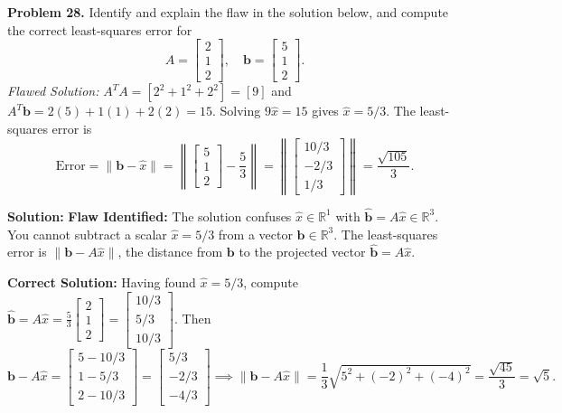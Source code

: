 \documentclass[11pt, letterpaper]{article}
\theoremstyle{definition}
\theoremstyle{remark}
\begin{document}
\textbf{Problem 28.} Identify and explain the flaw in the solution below, and compute the correct least-squares error for
\[
A = \begin{bmatrix} 2 \\ 1 \\ 2 \end{bmatrix}, \quad \mathbf{b} = \begin{bmatrix} 5 \\ 1 \\ 2 \end{bmatrix}.
\]
\textit{Flawed Solution:} $A^T A = [2^2 + 1^2 + 2^2] = [9]$ and $A^T \mathbf{b} = 2(5) + 1(1) + 2(2) = 15$. Solving $9\hat{x} = 15$ gives $\hat{x} = 5/3$. The least-squares error is
\[
\text{Error} = \|\mathbf{b} - \hat{x}\| = \left\| \begin{bmatrix} 5 \\ 1 \\ 2 \end{bmatrix} - \frac{5}{3} \right\| = \left\| \begin{bmatrix} 10/3 \\ -2/3 \\ 1/3 \end{bmatrix} \right\| = \frac{\sqrt{105}}{3}.
\]

\textbf{Solution:}
\textbf{Flaw Identified:} The solution confuses $\hat{x} \in \mathbb{R}^1$ with $\hat{\mathbf{b}} = A\hat{x} \in \mathbb{R}^3$. You cannot subtract a scalar $\hat{x} = 5/3$ from a vector $\mathbf{b} \in \mathbb{R}^3$. The least-squares error is $\|\mathbf{b} - A\hat{x}\|$, the distance from $\mathbf{b}$ to the projected vector $\hat{\mathbf{b}} = A\hat{x}$.

\textbf{Correct Solution:} Having found $\hat{x} = 5/3$, compute $\hat{\mathbf{b}} = A\hat{x} = \frac{5}{3}\begin{bmatrix} 2 \\ 1 \\ 2 \end{bmatrix} = \begin{bmatrix} 10/3 \\ 5/3 \\ 10/3 \end{bmatrix}$. Then
\[
\mathbf{b} - A\hat{x} = \begin{bmatrix} 5 - 10/3 \\ 1 - 5/3 \\ 2 - 10/3 \end{bmatrix} = \begin{bmatrix} 5/3 \\ -2/3 \\ -4/3 \end{bmatrix} \implies \|\mathbf{b} - A\hat{x}\| = \frac{1}{3}\sqrt{5^2 + (-2)^2 + (-4)^2} = \frac{\sqrt{45}}{3} = \sqrt{5}.
\]
\end{document}
